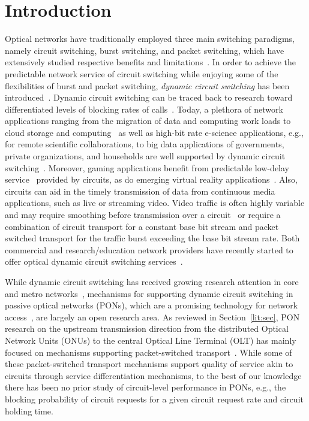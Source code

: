 \documentclass[article]{IEEEtran}
\begin{document}
\section{Introduction}
\label{sec:intro}
Optical networks have traditionally employed
three main switching paradigms, namely
circuit switching, burst switching, and packet
switching, which have extensively studied respective benefits and
limitations~\cite{PerformCS,OCSvsOBS01,OVSvsOBSpkt,NEHONET}.
In order to achieve the predictable network service of circuit switching
while enjoying some of the flexibilities of burst and packet
switching, \textit{dynamic circuit switching} has been
introduced~\cite{VeKC10}.
Dynamic circuit switching can be traced back to research
toward differentiated levels of blocking rates of calls~\cite{DCS1989}.
Today, a plethora of network applications ranging from
the migration of data and computing work loads to cloud storage and
computing~\cite{SBCD1009}
as well as high-bit rate e-science applications, e.g., for
remote scientific collaborations, to big data applications of
governments, private organizations, and households
are well supported by dynamic circuit switching~\cite{VeKC10}.
Moreover, gaming applications benefit from predictable
low-delay service~\cite{BrF10,FiGR02,MaH10,ScER02} provided by circuits,
as do emerging virtual reality
applications~\cite{KuB13,PaDR12,VaZK10}.
Also, circuits can aid in the timely transmission of
data from continuous media applications, such as live or
streaming video.
Video traffic is often highly variable and
may require smoothing before transmission over
a circuit~\cite{ghazi2012vmp,oh2008cont,QiKo11,ReLR02,ReT99,ShSZ11,AuRe09}
or require a combination of circuit transport for a constant
base bit stream and packet switched transport for the traffic burst
exceeding the base bit stream rate.
Both commercial and
research/education network providers have recently started
to offer optical dynamic circuit switching services~\cite{DOCS00,DCN}.

While dynamic circuit switching
has received growing research attention in core and metro
networks~\cite{DCN,Charb12,HybridN2010,Li08,MGJT0511,ReqprovDOCS,Sko12,VanBreu05,CircuitSONET},
mechanisms for supporting dynamic circuit switching in
passive optical networks (PONs), which are a
promising technology for network
access~\cite{Mahloo13,McR12,McRAS10,Siva13,ToKK12,Zan2013},
are largely an open research area.
As reviewed in Section~\ref{lit:sec}, PON research
on the upstream transmission direction from the distributed
Optical Network Units (ONUs) to the central Optical Line Terminal (OLT) has
mainly focused on mechanisms supporting packet-switched
transport~\cite{AuSH08,AuSRGM11,ZhMo09}.
While some of these packet-switched transport mechanisms
support quality of service akin to circuits through
service differentiation mechanisms, to the best of our knowledge
there has been no prior study of circuit-level performance
in PONs, e.g., the blocking probability of circuit requests
for a given circuit request rate and circuit holding time.
\end{document}
